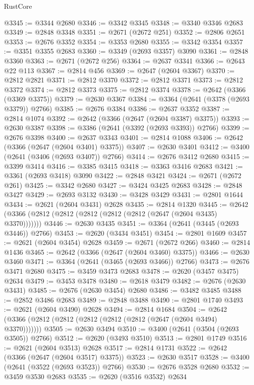 \begin{lexlean}{RustCore}
\begin{coremodule}
@3345 := @3344 @2680
@3346 := @3342 @3345
@3348 := @3340 @3346 @2683
@3349 := @2848 @3348
@3351 := @2671 (@2672 @251)
@3352 := @2806 @2651
@3353 := @2676 @3352
@3354 := @3353 @2680
@3355 := @3342 @3354
@3357 := @3351 @3355 @2683
@3360 := @3349 (@2693 @3357) @3090
@3361 := @2848 @3360
@3363 := @2671 (@2672 @256)
@3364 := @2637 @3341
@3366 := @2643 @22 @113
@3367 := @2814 @456
@3369 := @2647 (@2604 @3367)
@3370 := @2812 @2821
@3371 := @2812 @3370
@3372 := @2812 @3371
@3373 := @2812 @3372
@3374 := @2812 @3373
@3375 := @2812 @3374
@3378 := @2642 (@3366 (@3369 @3375))
@3379 := @2630 @3367
@3384 := @3364 (@2641 (@3378 (@2693 @3379)) @2766)
@3385 := @2676 @3384
@3386 := @2637 @3352
@3387 := @2814 @1074
@3392 := @2642 (@3366 (@2647 (@2604 @3387) @3375))
@3393 := @2630 @3387
@3398 := @3386 (@2641 (@3392 (@2693 @3393)) @2766)
@3399 := @2676 @3398
@3400 := @2637 @3343
@3401 := @2814 @1088
@3406 := @2642 (@3366 (@2647 (@2604 @3401) @3375))
@3407 := @2630 @3401
@3412 := @3400 (@2641 (@3406 (@2693 @3407)) @2766)
@3414 := @2676 @3412 @2680
@3415 := @3399 @3414
@3416 := @3385 @3415
@3418 := @3363 @3416 @2683
@3421 := @3361 (@2693 @3418) @3090
@3422 := @2848 @3421
@3424 := @2671 (@2672 @261)
@3425 := @3342 @2680
@3427 := @3424 @3425 @2683
@3428 := @2848 @3427
@3429 := @2693 @3132
@3430 := @3428 @3429
@3431 := @2801 @1644
@3434 := @2621 (@2604 @3431) @2628
@3435 := @2814 @1320
@3445 := @2642 (@3366 (@2812 (@2812 (@2812 (@2812 (@2812 (@2647 (@2604 @3435) @3370)))))))
@3446 := @2630 @3435
@3451 := @3364 (@2641 (@3445 (@2693 @3446)) @2766)
@3453 := @2620 (@3434 @3451)
@3454 := @2801 @1609
@3457 := @2621 (@2604 @3454) @2628
@3459 := @2671 (@2672 @266)
@3460 := @2814 @1436
@3465 := @2642 (@3366 (@2647 (@2604 @3460) @3375))
@3466 := @2630 @3460
@3471 := @3364 (@2641 (@3465 (@2693 @3466)) @2766)
@3473 := @2676 @3471 @2680
@3475 := @3459 @3473 @2683
@3478 := @2620 (@3457 @3475) @2634
@3479 := @3453 @3478
@3480 := @2618 @3479
@3482 := @2676 (@2630 @3431)
@3485 := @2676 (@2630 @3454) @2680
@3486 := @3482 @3485
@3488 := @2852 @3486 @2683
@3489 := @2848 @3488
@3490 := @2801 @1740
@3493 := @2621 (@2604 @3490) @2628
@3494 := @2814 @1684
@3504 := @2642 (@3366 (@2812 (@2812 (@2812 (@2812 (@2812 (@2647 (@2604 @3494) @3370)))))))
@3505 := @2630 @3494
@3510 := @3400 (@2641 (@3504 (@2693 @3505)) @2766)
@3512 := @2620 (@3493 @3510)
@3513 := @2801 @1749
@3516 := @2621 (@2604 @3513) @2628
@3517 := @2814 @1731
@3522 := @2642 (@3366 (@2647 (@2604 @3517) @3375))
@3523 := @2630 @3517
@3528 := @3400 (@2641 (@3522 (@2693 @3523)) @2766)
@3530 := @2676 @3528 @2680
@3532 := @3459 @3530 @2683
@3535 := @2620 (@3516 @3532) @2634

\end{coremodule}
\end{lexlean}
